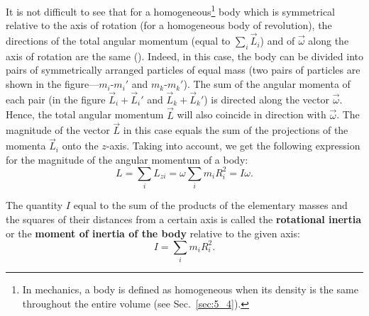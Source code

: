 It is not difficult to see that for a homogeneous\footnote{In mechanics, a body is defined as homogeneous when its density is the same throughout the entire volume (see Sec.~\ref{sec:5_4}).} body which is symmetrical relative to the axis of rotation (for a homogeneous body of revolution), the directions of the total angular momentum (equal to $\sum_i\vec{L}_i$) and of $\vec{\omega}$ along the axis of rotation are the same (). Indeed, in this case, the body can be divided into pairs of symmetrically arranged particles of equal mass (two pairs of particles are shown in the figure---$m_i$-$m_i'$ and $m_k$-$m_k'$). The sum of the angular momenta of each pair (in the figure $\vec{L}_i+\vec{L}_i'$ and $\vec{L}_k+\vec{L}_k'$) is directed along the vector $\vec{\omega}$. Hence, the total angular momentum $\vec{L}$ will also coincide in direction with $\vec{\omega}$. The magnitude of the vector $\vec{L}$ in this case equals the sum of the projections of the momenta $\vec{L}_i$ onto the $z$-axis. Taking  into account, we get the following expression for the magnitude of the angular momentum of a body:
\begin{equation}\label{eq:5_10}
L = \sum_i L_{zi} = \omega \sum_i m_i R_i^2 = I \omega.
\end{equation}

\noindent
The quantity $I$ equal to the sum of the products of the elementary masses and the squares of their distances from a certain axis is called the \textbf{rotational inertia} or the \textbf{moment of inertia of the body} relative to the given axis:
\begin{equation}\label{eq:5_11}
I = \sum_i m_i R_i^2.
\end{equation}

